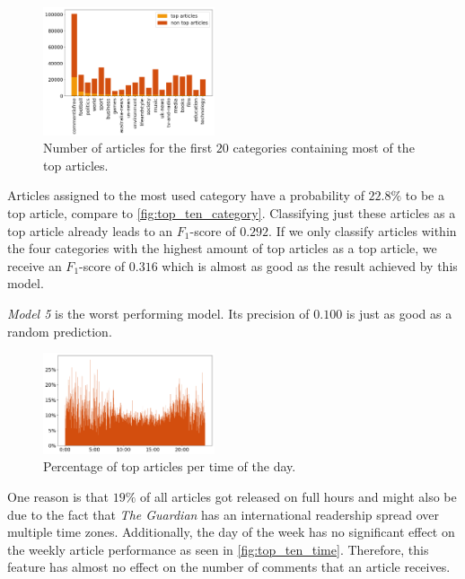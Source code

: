 \begin{figure}[h]
	\includegraphics[width=0.45\textwidth]{fig/top_ten_category.png}
	\caption{\textmd{Number of articles for the first $20$ categories containing most of the top articles.}}
	\label{fig:top_ten_category}
\end{figure}

Articles assigned to the most used category have a probability of $22.8\%$ to be a top article, compare to \autoref{fig:top_ten_category}. Classifying just these articles as a top article already leads to an $F_1$-score of $0.292$. 
If we only classify articles within the four categories with the highest amount of top articles as a top article, we receive an $F_1$-score of $0.316$ which is almost as good as the result achieved by this model.

\textit{Model 5} is the worst performing model. Its precision of $0.100$ is just as good as a random prediction.

\begin{figure}[h]
	\includegraphics[width=0.45\textwidth]{fig/top_ten_time.png}
	\caption{\textmd{Percentage of top articles per time of the day.}}
	\label{fig:top_ten_time}
\end{figure}

One reason is that $19\%$ of all articles got released on full hours and might also be due to the fact that \textit{The Guardian} has an international readership spread over multiple time zones. Additionally, the day of the week has no significant effect on the weekly article performance as seen in \autoref{fig:top_ten_time}. Therefore, this feature has almost no effect on the number of comments that an article receives. 

